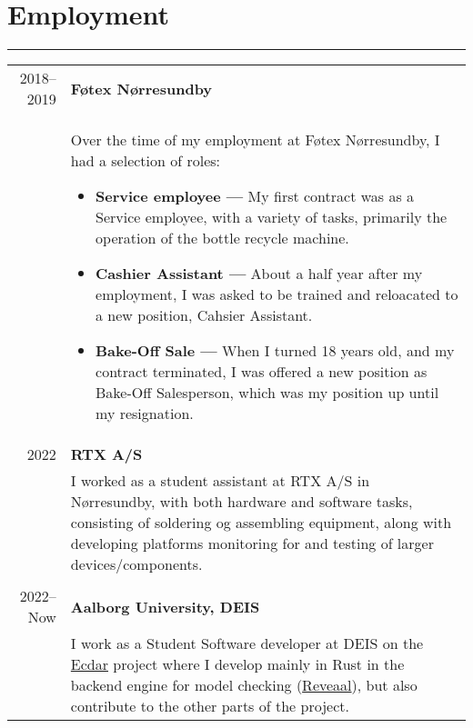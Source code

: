 \documentclass{article}
\begin{document}
\section*{Employment}
\hrule width5cm
\begin{longtabu} to \textwidth {r|X}
2018--2019 & \textbf{Føtex Nørresundby}\\
&   Over the time of my employment at Føtex Nørresundby, I had a selection of roles:
        \begin{itemize}\setlength\itemsep{0em}
            \item[] \textbf{Service employee --- } My first contract was as a Service employee,
                with a variety of tasks, primarily the operation of the bottle recycle machine.
            \item[] \textbf{Cashier Assistant --- } About a half year after my employment,
                I was asked to be trained and reloacated to a new position, Cahsier Assistant.
            \item[] \textbf{Bake-Off Sale --- } When I turned 18 years old, and my contract
                terminated, I was offered a new position as Bake-Off Salesperson, which was my
                position up until my resignation.
        \end{itemize} \\
    2022 & \textbf{RTX A/S}\\
    &   I worked as a student assistant at RTX A/S in Nørresundby, with both hardware and software tasks,
        consisting of soldering og assembling equipment, along with developing platforms monitoring for and testing of larger devices/components. \\\\
2022--Now & \textbf{Aalborg University, DEIS}\\
    &   I work as a Student Software developer at DEIS on the \href{https://github.com/Ecdar}{Ecdar} project
    where I develop mainly in Rust in the backend engine for model checking
    (\href{https://github.com/Ecdar/Reveaal}{Reveaal}), but also contribute to the other parts of the project.

\end{longtabu}
\end{document}
